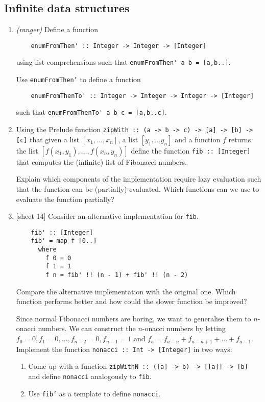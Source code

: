 \documentclass{article}
\def\code#1{\texttt{#1}}
\begin{document}
\subsection{Infinite data structures}
\begin{enumerate}
    \item \textit{(ranger)} Define a function
        \begin{verbatim}
    enumFromThen' :: Integer -> Integer -> [Integer]
        \end{verbatim}
        using list comprehensions such that \verb|enumFromThen' a b = [a,b..]|. \par
        Use \code{enumFromThen'} to define a function
        \begin{verbatim}
    enumFromThenTo' :: Integer -> Integer -> Integer -> [Integer]
        \end{verbatim}
        such that \verb|enumFromThenTo' a b c = [a,b..c]|.

    \item Using the Prelude function \code{zipWith :: (a -> b -> c) -> [a] -> [b] -> [c]} that given a list $[x_1, \dots, x_n]$, a list $[y_1, \dots y_n]$ and a function $f$ returns the list $[f(x_1, y_1), \dots, f(x_n, y_n)]$ define the function \code{fib :: [Integer]} that computes the (infinite) list of Fibonacci numbers. \par
    Explain which components of the implementation require lazy evaluation such that the function can be (partially) evaluated. Which functions can we use to evaluate the function partially?

    \item {[sheet 14]} Consider an alternative implementation for \code{fib}.
        \begin{verbatim}
    fib' :: [Integer]
    fib' = map f [0..]
      where
        f 0 = 0
        f 1 = 1
        f n = fib' !! (n - 1) + fib' !! (n - 2)
        \end{verbatim}
        Compare the alternative implementation with the original one. Which function performs better and how could the slower function be improved? \par
        Since normal Fibonacci numbers are boring, we want to generalise them to $n$-onacci numbers. We can construct the $n$-onacci numbers by letting $f_0 = 0, f_1 = 0, \dots, f_{n-2} = 0, f_{n-1} = 1$ and $f_a = f_{a-n} + f_{a-n+1} + \dots + f_{a-1}$. Implement the function \code{nonacci :: Int -> [Integer]} in two ways:
        \begin{enumerate}
            \item Come up with a function \code{zipWithN :: ([a] -> b) -> [[a]] -> [b]} and define \code{nonacci} analogously to \code{fib}.
            \item Use \code{fib'} as a template to define \code{nonacci}.
        \end{enumerate}
\end{enumerate}
\end{document}
